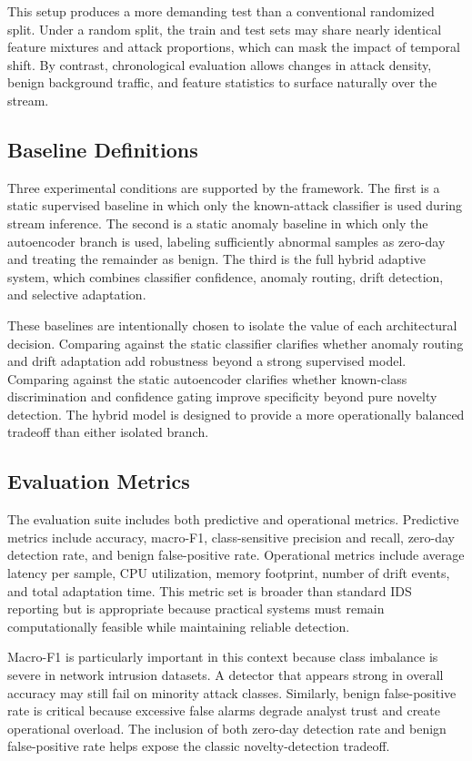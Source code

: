 \documentclass[conference]{IEEEtran}
\begin{document}
This setup produces a more demanding test than a conventional randomized split. Under a random split, the train and test sets may share nearly identical feature mixtures and attack proportions, which can mask the impact of temporal shift. By contrast, chronological evaluation allows changes in attack density, benign background traffic, and feature statistics to surface naturally over the stream.

\subsection{Baseline Definitions}
Three experimental conditions are supported by the framework. The first is a static supervised baseline in which only the known-attack classifier is used during stream inference. The second is a static anomaly baseline in which only the autoencoder branch is used, labeling sufficiently abnormal samples as zero-day and treating the remainder as benign. The third is the full hybrid adaptive system, which combines classifier confidence, anomaly routing, drift detection, and selective adaptation.

These baselines are intentionally chosen to isolate the value of each architectural decision. Comparing against the static classifier clarifies whether anomaly routing and drift adaptation add robustness beyond a strong supervised model. Comparing against the static autoencoder clarifies whether known-class discrimination and confidence gating improve specificity beyond pure novelty detection. The hybrid model is designed to provide a more operationally balanced tradeoff than either isolated branch.

\subsection{Evaluation Metrics}
The evaluation suite includes both predictive and operational metrics. Predictive metrics include accuracy, macro-F1, class-sensitive precision and recall, zero-day detection rate, and benign false-positive rate. Operational metrics include average latency per sample, CPU utilization, memory footprint, number of drift events, and total adaptation time. This metric set is broader than standard IDS reporting but is appropriate because practical systems must remain computationally feasible while maintaining reliable detection.

Macro-F1 is particularly important in this context because class imbalance is severe in network intrusion datasets. A detector that appears strong in overall accuracy may still fail on minority attack classes. Similarly, benign false-positive rate is critical because excessive false alarms degrade analyst trust and create operational overload. The inclusion of both zero-day detection rate and benign false-positive rate helps expose the classic novelty-detection tradeoff.
\end{document}
